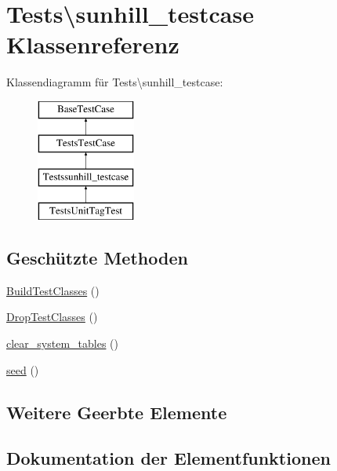 \hypertarget{classTests_1_1sunhill__testcase}{}\section{Tests\textbackslash{}sunhill\+\_\+testcase Klassenreferenz}
\label{classTests_1_1sunhill__testcase}
Klassendiagramm für Tests\textbackslash{}sunhill\+\_\+testcase\+:\begin{figure}[H]
\begin{center}
\leavevmode
\includegraphics[height=4.000000cm]{df/d50/classTests_1_1sunhill__testcase}
\end{center}
\end{figure}
\subsection*{Geschützte Methoden}
\begin{DoxyCompactItemize}
\item 
\hyperlink{classTests_1_1sunhill__testcase_a2d2c90fb764c8e580a9df77818741ad8}{Build\+Test\+Classes} ()
\item 
\hyperlink{classTests_1_1sunhill__testcase_a80491403d0ff71b30ff1e233f1150297}{Drop\+Test\+Classes} ()
\item 
\hyperlink{classTests_1_1sunhill__testcase_a42ff99508e08ebfe4986c2053b51fad8}{clear\+\_\+system\+\_\+tables} ()
\item 
\hyperlink{classTests_1_1sunhill__testcase_a04d265984ab8a5476f7253c8e6b4fc55}{seed} ()
\end{DoxyCompactItemize}
\subsection*{Weitere Geerbte Elemente}


\subsection{Dokumentation der Elementfunktionen}
\mbox{\label{classTests_1_1sunhill__testcase_a2d2c90fb764c8e580a9df77818741ad8}} 
